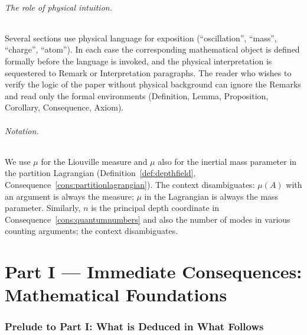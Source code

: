 \documentclass[11pt,twocolumn,a4paper]{article}
\theoremstyle{axiomstyle}
\theoremstyle{conseqstyle}
\theoremstyle{definition}
\theoremstyle{remark}
\begin{document}
\paragraph{The role of physical intuition.} Several sections use physical language for exposition (``oscillation'', ``mass'', ``charge'', ``atom''). In each case the corresponding mathematical object is defined formally before the language is invoked, and the physical interpretation is sequestered to Remark or Interpretation paragraphs. The reader who wishes to verify the logic of the paper without physical background can ignore the Remarks and read only the formal environments (Definition, Lemma, Proposition, Corollary, Consequence, Axiom).

\paragraph{Notation.} We use $\mu$ for the Liouville measure and $\mu$ also for the inertial mass parameter in the partition Lagrangian (Definition~\ref{def:depthfield}, Consequence~\ref{cons:partitionlagrangian}). The context disambiguates: $\mu(A)$ with an argument is always the measure; $\mu$ in the Lagrangian is always the mass parameter. Similarly, $n$ is the principal depth coordinate in Consequence~\ref{cons:quantumnumbers} and also the number of modes in various counting arguments; the context disambiguates.

\clearpage

\part*{Part I --- Immediate Consequences: Mathematical Foundations}

\section*{Prelude to Part I: What is Deduced in What Follows}
\end{document}
